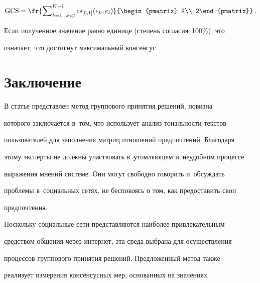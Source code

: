 \begin{enumerate}[1.]
\begin{enumerate}[(1)]
\begin{equation*}
 \mathrm{ GCS}=\fr{\sum\nolimits^{K-1}_{k=1,\ k<l} \mathrm{cs}_{[0,1]}(e_k, 


e_l)}{\begin{pmatrix} K\\ 2\end{pmatrix}}\,.




  \end{equation*}


  


  Если полученное значение равно единице (степень согласия~100\%), это 


означает, что достигнут максимальный консенсус. 


  \end{enumerate}


  \end{enumerate}


  


\section{Заключение}





  В статье представлен метод группового принятия решений, новизна 


которого заключается в~том, что использует анализ тональности текстов 


пользователей для заполнения матриц отношений предпочтений. Благодаря 


этому эксперты не должны участвовать в~утомляющем и~неудобном процессе 


выражения мнений системе.  Они могут свободно говорить и~обсуждать 


проблемы в~социальных сетях, не беспокоясь о том, как предоставить свои 


предпочтения. 


  


  Поскольку социальные сети представляются наиболее привлекательным 


средством общения через интернет, эта среда выбрана для осуществления 


процессов группового принятия решений. Предложенный метод также 


реализует измерения консенсусных мер, основанных на значениях 


